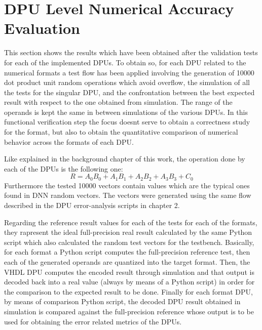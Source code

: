 \section{DPU Level Numerical Accuracy Evaluation}



This section shows the results which have been obtained after the validation tests for each of the implemented DPUs. To obtain so, for each DPU related to the numerical formats a test flow has been applied involving the generation of 10000 dot product unit random operations which avoid overflow, the simulation of all the tests for the singular DPU, and the confrontation between the best expected result with respect to the one obtained from simulation. The range of the operands is kept the same in between simulations of the various DPUs. In this functional verification step the focus doesnt serve to obtain a correctness study for the format, but also to obtain the quantitative comparison of numerical behavior across the formats of each DPU. 

Like explained in the background chapter of this work, the operation done by each of the DPUs is the following one: \begin{equation}
R = A_0B_0 + A_1B_1 + A_2B_2 + A_3B_3 + C_0
\end{equation} Furthermore the tested 10000 vectors contain values which are the typical ones found in DNN random vectors. The vectors were generated using the same flow described in the DPU error-analysis scripts in chapter 2. 

Regarding the reference result values for each of the tests for each of the formats, they rapresent the ideal full-precision real result calculated by the same Python script which also calculated the random test vectors for the testbench. Basically, for each format a Python script computes the full-precision reference test, then each of the generated operands are quantized into the target format. Then, the VHDL DPU computes the encoded result through simulation and that output is decoded back into a real value (always by means of a Python script) in order for the comparison to the expected result to be done. Finally for each format DPU, by means of comparison Python script, the decoded DPU result obtained in simulation is compared against the full-precision reference whose output is to be used for obtaining the error related metrics of the DPUs. 

